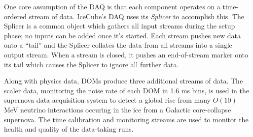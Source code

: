 
One core assumption of the DAQ is that each component operates on a
time-ordered stream of data.  IceCube's DAQ uses its \emph{Splicer} to
accomplish this.  The Splicer is a common object which gathers all input
streams during the setup phase; no inputs can be added once it's started.  Each
stream pushes new data onto a ``tail'' and the Splicer collates
the data from all streams into a single output stream.  When a
stream is closed, it pushes an end-of-stream marker onto its tail which causes
the Splicer to ignore all further data.




Along with physics data, DOMs produce three additional streams of data.
The scaler data, monitoring the noise rate of each DOM in 1.6 ms bins,
is used in the supernova data acquisition system \cite{sndaq} to detect a
global rise from many $O(10)$ MeV neutrino interactions occuring in the ice
from a Galactic core-collapse supernova.  The time calibration and monitoring
streams are used to monitor the health and quality of the data-taking runs.

